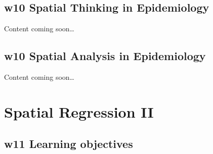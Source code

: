 \documentclass[
]{book}
\begin{document}
\hypertarget{w10-spatial-thinking-in-epidemiology}{%
\section{w10 Spatial Thinking in Epidemiology}\label{w10-spatial-thinking-in-epidemiology}}

Content coming soon\ldots{}

\hypertarget{w10-spatial-analysis-in-epidemiology}{%
\section{w10 Spatial Analysis in Epidemiology}\label{w10-spatial-analysis-in-epidemiology}}

Content coming soon\ldots{}

\hypertarget{spatial-regression-ii}{%
\chapter{Spatial Regression II}\label{spatial-regression-ii}}

\hypertarget{w11-learning-objectives}{%
\section{w11 Learning objectives}\label{w11-learning-objectives}}

 
  \providecommand{\huxb}[2]{\arrayrulecolor[RGB]{#1}\global\arrayrulewidth=#2pt}
  \providecommand{\huxvb}[2]{\color[RGB]{#1}\vrule width #2pt}
  \providecommand{\huxtpad}[1]{\rule{0pt}{#1}}
  \providecommand{\huxbpad}[1]{\rule[-#1]{0pt}{#1}}
\end{document}
